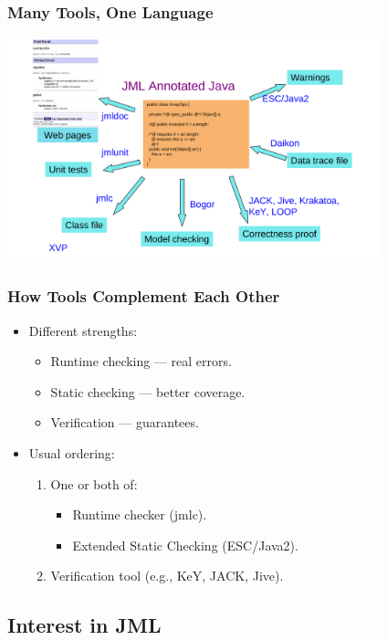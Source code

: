 \begin{frame}
\frametitle{Many Tools, One Language}
\includegraphics[width=4.25in]{tools-overview}
\end{frame}

\begin{frame}
\frametitle{How Tools Complement Each Other}
\begin{itemize}
\item
Different strengths:
\begin{itemize}
\item
Runtime checking --- real errors.

\item
Static checking --- better coverage.

\item
Verification --- guarantees.
\end{itemize}

\item
Usual ordering:
\begin{enumerate}
\item
One or both of:
\begin{itemize}
\item
Runtime checker (jmlc).

\item
Extended Static Checking (ESC/Java2).
\end{itemize}

\item
Verification tool (e.g., KeY, JACK, Jive).
\end{enumerate}
\end{itemize}
\end{frame}

\subsection[Interest]{Interest in JML}

